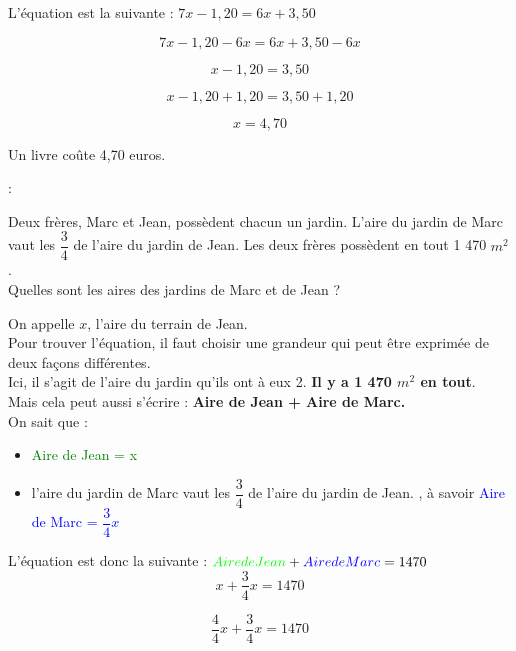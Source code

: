 \documentclass[a4paper,11pt]{article}
\newcounter{numexo}
\newcommand{\exo}[1]{\stepcounter{numexo}\noindent{\bf Exercice~\thenumexo} : }
\newcommand{\bi}{\begin{itemize}}
\newcommand{\ei}{\end{itemize}}
\begin{document}
L'équation est la suivante : \hspace*{1cm} $7x-1,20= 6x+3,50$ 


$$7x-1,20-6x= 6x+3,50-6x$$

$$x-1,20= 3,50$$

$$x-1,20+1,20=3,50+1,20$$

$$x=4,70$$

Un livre coûte 4,70 euros.\\

 \color{black}
\vspace*{0.5cm}

\exo \\

Deux frères, Marc et Jean, possèdent chacun un jardin. L'aire du jardin de Marc vaut les $\dfrac{3}{4}$ de l'aire du jardin de Jean. Les deux frères possèdent en tout 1 470 $ m^{2} $.\\

Quelles sont les aires des jardins de Marc et de Jean  ?\\

\color{red}


On appelle $x$, l'aire du terrain de Jean.\\

Pour trouver l'équation, il faut choisir une grandeur qui peut être exprimée de deux façons différentes.\\

Ici, il s'agit de l'aire du jardin qu'ils ont à eux 2.\hspace*{1cm} \textbf{Il y a 1 470 $m^{2}$ en tout}.\\

Mais cela peut aussi s'écrire : \textbf{Aire de Jean + Aire de Marc.}\\

On sait que :
\bi
\item \textcolor{green}{Aire de Jean = x}

\item l'aire du jardin de Marc vaut les $\dfrac{3}{4}$ de l'aire du jardin de Jean. , à savoir \textcolor{blue}{Aire de Marc = $\dfrac{3}{4}x$ }

\ei

L'équation est donc la suivante : \hspace*{1cm} $ \textcolor{green}{Aire de Jean } + \textcolor{blue}{Aire de Marc}  = 1 470$\\

$$ x + \dfrac{3}{4}x = 1470$$


$$ \dfrac{4}{4}x + \dfrac{3}{4}x = 1470$$
\end{document}
